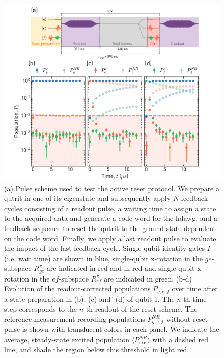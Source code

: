 \begin{figure}[ht]
    \centering
    \includegraphics[width=\textwidth]{appendices/qutrit_readout/figs/ch3_readout_active_reset_residual_populations_20200118_175702_with_scheme.png}
    \caption{(a) Pulse scheme used to test the active reset protocol. We prepare a qutrit in one of its eigenstate and subsequently apply $N$ feedback cycles consisting of a readout pulse, a waiting time to assign a state to the acquired data and generate a code word for the \gls{hdawg}, and a feedback sequence to reset the qutrit to the ground state dependent on the code word. Finally, we apply a last readout pulse to evaluate the impact of the last feedback cycle. Single-qubit identity gates $I$ (i.e. wait time) are shown in blue, single-qubit x-rotation in the $ge$-subspace $R_{ge}^{\pi}$ are indicated in red and in red and single-qubit x-rotation in the $ef$-subspace $R_{ef}^{\pi}$ are indicated in green. (b-d) Evolution of the readout-corrected populations $P_{g,e,f}^c$ over time after a state preparation in \g{} (b), \e{} (c) and \f{} (d) of qubit 1. The $n$-th time step corresponds to the $n$-th readout of the reset scheme. The reference measurement recording populations $P_{g,e,f}^{NR}$ without reset pulse is shown with translucent colors in each panel. We indicate the average, steady-state excited population $\langle P_{\textrm{exc}}^{NR}\rangle$ with a dashed red line, and shade the region below this threshold in light red.}
    \label{fig:qutrit_readout_active_reset_populations}
\end{figure}

